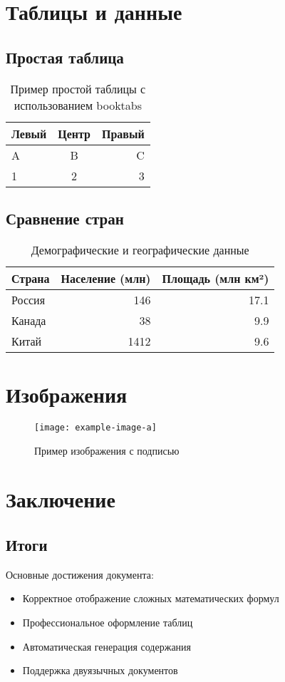 \documentclass[a4paper,12pt]{article}
\begin{document}
\section{Таблицы и данные}
\subsection{Простая таблица}
\begin{table}[H]
    \centering
    \begin{tabular}{lcr}
        \toprule
        Левый & Центр & Правый \\
        \midrule
        A & B & C \\
        1 & 2 & 3 \\
        \bottomrule
    \end{tabular}
    \caption{Пример простой таблицы с использованием booktabs}
    \label{tab:simple}
\end{table}

\subsection{Сравнение стран}
\begin{table}[H]
    \centering
    \begin{tabular}{@{}lrr@{}}
        \toprule
        Страна & Население (млн) & Площадь (млн км²) \\
        \midrule
        Россия & 146 & 17.1 \\
        Канада & 38  & 9.9  \\
        Китай  & 1412& 9.6  \\
        \bottomrule
    \end{tabular}
    \caption{Демографические и географические данные}
    \label{tab:countries}
\end{table}

\section{Изображения}
\begin{figure}[H]
    \centering
    \texttt{[image: example-image-a]} %
    \caption{Пример изображения с подписью}
    \label{fig:sample}
\end{figure}

\section{Заключение}
\subsection{Итоги}
Основные достижения документа:
\begin{itemize}
    \item Корректное отображение сложных математических формул
    \item Профессиональное оформление таблиц
    \item Автоматическая генерация содержания
    \item Поддержка двуязычных документов
\end{itemize}
\end{document}
